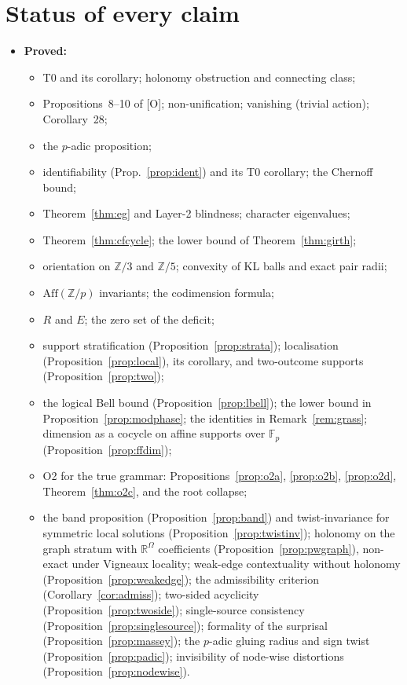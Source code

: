 \documentclass[11pt]{article}
\theoremstyle{definition}
\theoremstyle{remark}
\newcommand{\Z}{\mathbb{Z}}
\newcommand{\R}{\mathbb{R}}
\newcommand{\F}{\mathbb{F}}
\newcommand{\Aff}{\mathrm{Aff}}
\newcommand{\src}[1]{\textsf{\small[#1]}}
\begin{document}
\section{Status of every claim}
\begin{itemize}
  \item \textbf{Proved:}
  \begin{itemize}
    \item T0 and its corollary; holonomy obstruction and connecting class;
    \item Propositions~8--10 of \src{O}; non-unification; vanishing (trivial action); Corollary~28;
    \item the $p$-adic proposition;
    \item identifiability (Prop.~\ref{prop:ident}) and its T0 corollary; the Chernoff bound;
    \item Theorem~\ref{thm:eg} and Layer-2 blindness; character eigenvalues;
    \item Theorem~\ref{thm:cfcycle}; the lower bound of Theorem~\ref{thm:girth};
    \item orientation on $\Z/3$ and $\Z/5$; convexity of KL balls and exact pair radii;
    \item $\Aff(\Z/p)$ invariants; the codimension formula;
    \item $R$ and $E$; the zero set of the deficit;
    \item support stratification (Proposition~\ref{prop:strata}); localisation (Proposition~\ref{prop:local}), its corollary, and two-outcome supports (Proposition~\ref{prop:two});
    \item the logical Bell bound (Proposition~\ref{prop:lbell}); the lower bound in Proposition~\ref{prop:modphase}; the identities in Remark~\ref{rem:grass}; dimension as a cocycle on affine supports over $\F_p$ (Proposition~\ref{prop:ffdim});
    \item O2 for the true grammar: Propositions~\ref{prop:o2a}, \ref{prop:o2b}, \ref{prop:o2d}, Theorem~\ref{thm:o2c}, and the root collapse;
    \item the band proposition (Proposition~\ref{prop:band}) and twist-invariance for symmetric local solutions (Proposition~\ref{prop:twistinv}); holonomy on the graph stratum with $\R^\Omega$ coefficients (Proposition~\ref{prop:pwgraph}), non-exact under Vigneaux locality; weak-edge contextuality without holonomy (Proposition~\ref{prop:weakedge}); the admissibility criterion (Corollary~\ref{cor:admiss}); two-sided acyclicity (Proposition~\ref{prop:twoside}); single-source consistency (Proposition~\ref{prop:singlesource}); formality of the surprisal (Proposition~\ref{prop:massey}); the $p$-adic gluing radius and sign twist (Proposition~\ref{prop:padic}); invisibility of node-wise distortions (Proposition~\ref{prop:nodewise}).

\end{itemize}
\end{itemize}
\end{document}
